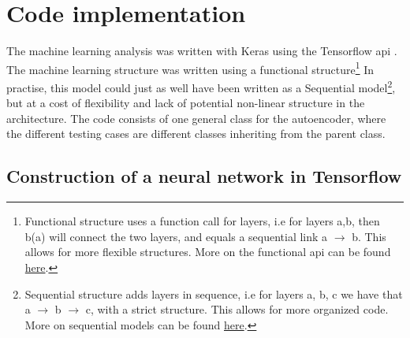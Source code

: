 \section{Code implementation}

The machine learning analysis was written with Keras\cite{chollet2015keras} using the Tensorflow api\cite{tensorflow2015-whitepaper} . 
The machine learning structure was written using a functional structure\footnote{Functional structure uses a function call for layers, i.e for layers a,b, then b(a) will connect the two layers, and equals a sequential link a $\to$ b. This allows for more flexible structures. More on the functional api can be found \href{https://www.tensorflow.org/guide/keras/functional}{here}.}
In practise, this model could just as well have been written as a Sequential model\footnote{Sequential structure adds layers in sequence, i.e for layers a, b, c we have that a $\to$ b $\to$ c, with a strict structure. This allows for more organized code. More on sequential models can be found \href{https://www.tensorflow.org/guide/keras/sequential_model}{here}.}, 
but at a cost of flexibility and lack of potential non-linear structure in the architecture. The code consists of one general class for
 the autoencoder, where the different testing cases are different classes inheriting from the parent class.\par




\subsection*{Construction of a neural network in Tensorflow}

